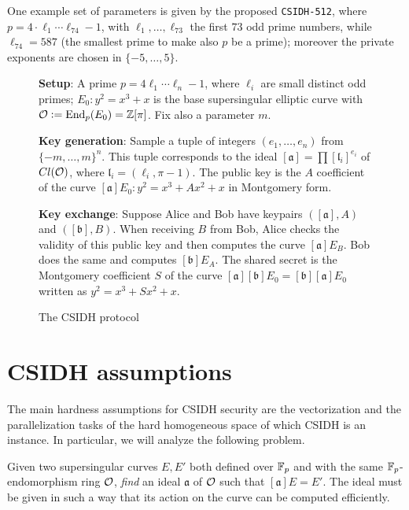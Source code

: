 One example set of parameters is given by the proposed \texttt{CSIDH-512}, where $p=4\cdot\ell_1\cdots\ell_{74}-1$, with $\ell_1,\dots,\ell_{73}$ the first $73$ odd prime numbers, while $\ell_{74}=587$ (the smallest prime to make also $p$ be a prime); moreover the private exponents are chosen in $\{ -5,\dots,5 \}$.

\begin{figure}
    \begin{framed}
        \textbf{Setup}: A prime $p=4\ell_1\cdots\ell_n-1$, where $\ell_i$ are small distinct odd primes; $E_0:y^2=x^3+x$ is the base supersingular elliptic curve with $\mathcal{O}:=\operatorname{End}_p(E_0)=\mathbb{Z}[\pi]$. Fix also a parameter $m$.
        
        \textbf{Key generation}: Sample a tuple of integers $(e_1,\dots,e_n)$ from $\{ -m,\dots,m \}^n$. This tuple corresponds to the ideal $[\mathfrak{a}] = \prod [\mathfrak{l}_i]^{e_i}$ of $Cl(\mathcal{O})$, where $\mathfrak{l}_i=(\ell_i, \pi-1)$. The public key is the $A$ coefficient of the curve $[\mathfrak{a}]E_0:y^2=x^3+Ax^2+x$ in Montgomery form.
        
        \textbf{Key exchange}: Suppose Alice and Bob have keypairs $([\mathfrak{a}], A)$ and $([\mathfrak{b}], B)$. When receiving $B$ from Bob, Alice checks the validity of this public key and then computes the curve $[\mathfrak{a}]E_B$. Bob does the same and computes $[\mathfrak{b}]E_A$. The shared secret is the Montgomery coefficient $S$ of the curve $[\mathfrak{a}][\mathfrak{b}]E_0=[\mathfrak{b}][\mathfrak{a}]E_0$ written as $y^2=x^3+Sx^2+x$.
    \end{framed}
    \caption{The CSIDH protocol}
    \label{prot_CSIDH}
\end{figure}


\section{CSIDH assumptions}
The main hardness assumptions for CSIDH security are the vectorization and the parallelization tasks of the hard homogeneous space of which CSIDH is an instance. In particular, we will analyze the following problem.

\begin{problem}\label{problem_csidh}
    Given two supersingular curves $E,E'$ both defined over $\mathbb{F}_p$ and with the same $\mathbb{F}_p$-endomorphism ring $\mathcal{O}$, \emph{find} an ideal $\mathfrak{a}$ of $\mathcal{O}$ such that $[\mathfrak{a}]E=E'$. The ideal must be given in such a way that its action on the curve can be computed efficiently.
\end{problem}

